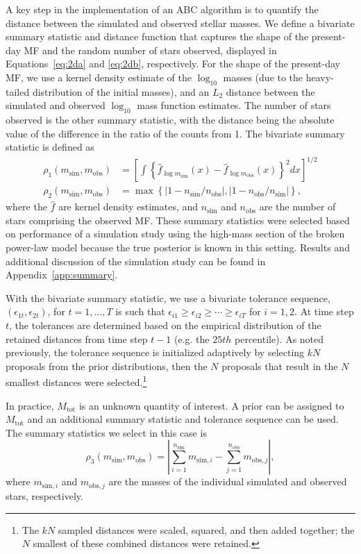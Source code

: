 \documentclass[12pt]{article}
\newcommand{\msim}{m_{\text{sim}}}
\newcommand{\mobs}{m_{\text{obs}}}
\newcommand{\nsim}{n_{\text{sim}}}
\newcommand{\nobs}{n_{\text{obs}}}
\newcommand{\Mtot}{M_{\text{tot}}}
\begin{document}
A key step in the implementation of an ABC algorithm is to quantify the distance between the simulated and observed stellar masses.  We define a bivariate summary statistic and distance function that captures the shape of the present-day MF and the random number of stars observed, displayed in Equations~\eqref{eq:2da} and \eqref{eq:2db}, respectively.  For the shape of the present-day MF, we use a kernel density estimate of the $\log_{10}$ masses (due to the heavy-tailed distribution of the initial masses), and an $L_2$ distance between the simulated and observed $\log_{10}$ mass function estimates.  The number of stars observed is the other summary statistic, with the distance being the absolute value of the difference in the ratio of the counts from 1. The bivariate summary statistic is defined as
\begin{align}
\rho_1(\msim, \mobs) &= \left [\displaystyle \int \left \{\hat f_{\log \msim}(x) - \hat f_{\log \mobs}(x) \right \}^2 dx \right]^{1/2} \label{eq:2da} \\ 
\rho_2(\msim, \mobs) &= \max\left\{\left|1 - \nsim/ \nobs\right |, \left|1 - \nobs/ \nsim\right |  \right\} \text{,}   \label{eq:2db}
\end{align}
where the $\hat f$ are kernel density estimates, and $\nsim$ and $\nobs$ are the number of stars comprising the observed MF.  These summary statistics were selected based on performance of a simulation study using the high-mass section of the broken power-law model because the true posterior is known in this setting.  Results and additional discussion of the simulation study can be found in Appendix~\ref{app:summary}.

With the bivariate summary statistic, we use a bivariate tolerance sequence, $(\epsilon_{1t}, \epsilon_{2t})$, for $t = 1, \ldots, T$ is such that $\epsilon_{i1} \geq \epsilon_{i2} \geq \cdots \geq \epsilon_{iT}$ for $i = 1, 2$.  At time step $t$, the tolerances are determined based on the  empirical distribution of the retained distances from time step $t-1$ (e.g. the $25th$ percentile).  As noted previously, the tolerance sequence is initialized adaptively by selecting $kN$ proposals from the prior distributions, then the $N$ proposals that result in the $N$ smallest distances were selected.\footnote{The $kN$ sampled distances were scaled, squared, and then added together; the $N$ smallest of these combined distances were retained.}

In practice, $\Mtot$ is an unknown quantity of interest.  A prior can be assigned to $\Mtot$ and an additional summary statistic and tolerance sequence can be used.  The summary statistics we select in this case is
\begin{equation}
\rho_3(\msim, \mobs) = \left| \sum_{i = 1}^{\nsim} m_{\text{sim}, i} - \sum_{j = 1}^{\nobs} m_{\text{obs}, j} \right|, \label{eq:2dc}
\end{equation}
where $m_{\text{sim}, i}$ and $m_{\text{obs}, j}$ are the masses of the individual simulated and observed stars, respectively.  
\end{document}
